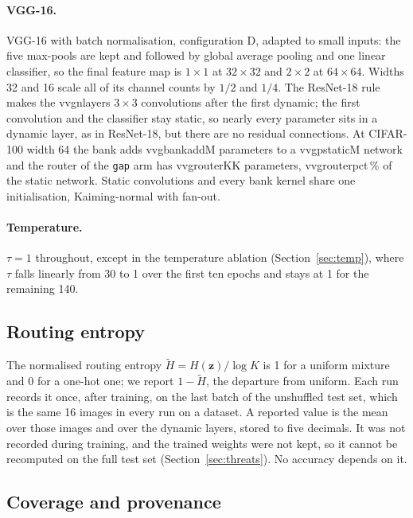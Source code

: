\documentclass[10pt,a4paper]{article}
\newcommand{\zv}{\mathbf{z}}
\newcommand{\V}[1]{\csname v#1\endcsname}
\begin{document}
\paragraph{VGG-16.} VGG-16 \citep{simonyan2015vgg} with batch
normalisation, configuration D, adapted to small inputs: the five
max-pools are kept and followed by global average pooling and one linear
classifier, so the final feature map is $1\times1$ at $32\times32$ and
$2\times2$ at $64\times64$. Widths 32 and 16 scale all of its channel counts by
$1/2$ and $1/4$. The ResNet-18 rule makes the \V{vgnlayers} $3\times3$
convolutions after the first dynamic; the first convolution and the
classifier stay static, so nearly every parameter sits in a dynamic layer,
as in ResNet-18, but there are no residual connections. At CIFAR-100
width 64 the bank adds \V{vgbankadd}M parameters to a \V{vgpstatic}M
network and the router of the \texttt{gap} arm has \V{vgrouterK}K
parameters, \V{vgrouterpct}\,\% of the static network. Static
convolutions and every bank kernel share one initialisation,
Kaiming-normal with fan-out.

\paragraph{Temperature.} $\tau=1$ throughout, except in the temperature
ablation (Section~\ref{sec:temp}), where $\tau$ falls linearly from 30 to
1 over the first ten epochs and stays at 1 for the remaining 140.

\subsection{Routing entropy}\label{sec:entdef}

The normalised routing entropy $\tilde H=H(\zv)/\log K$ is 1 for a
uniform mixture and 0 for a one-hot one; we report $1-\tilde H$, the
departure from uniform. Each run records it once, after training, on the
last batch of the unshuffled test set, which is the same 16 images in
every run on a dataset. A reported value is the mean over those images
and over the dynamic layers, stored to five decimals. It was not recorded
during training, and the
trained weights were not kept, so it cannot be recomputed on the full
test set (Section~\ref{sec:threats}). No accuracy depends on it.

\subsection{Coverage and provenance}
\end{document}
